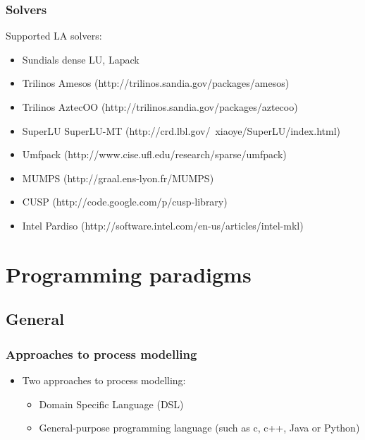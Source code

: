 \documentclass[compress,newPxFont,sthlmFooter]{beamer}
\begin{document}
\begin{frame}
\frametitle{Solvers}
\begin{block}{}
Supported LA solvers:
\begin{itemize}
  \item Sundials dense LU, Lapack
  \item Trilinos Amesos ({\small http://trilinos.sandia.gov/packages/amesos}) 
  \item Trilinos AztecOO ({\small http://trilinos.sandia.gov/packages/aztecoo}) 
  \item SuperLU SuperLU-MT ({\small http://crd.lbl.gov/~xiaoye/SuperLU/index.html}) 
  \item Umfpack ({\small http://www.cise.ufl.edu/research/sparse/umfpack}) 
  \item MUMPS ({\small http://graal.ens-lyon.fr/MUMPS})
  \item CUSP ({\small http://code.google.com/p/cusp-library}) 
  \item Intel Pardiso ({\small http://software.intel.com/en-us/articles/intel-mkl})
\end{itemize}
\end{block}
\end{frame}



\section{Programming paradigms}

\subsection{General}
\begin{frame}
\frametitle{Approaches to process modelling}
\begin{block}{}
\begin{itemize}
  \item Two approaches to process modelling:
  \begin{itemize}
    \item Domain Specific Language (DSL)
    \item General-purpose programming language (such as c, c++, Java or Python)
  \end{itemize}
\end{itemize}
\end{block}
\end{frame}
\end{document}

